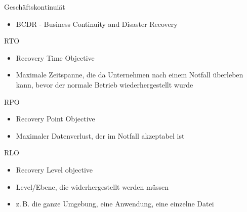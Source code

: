

\begin{flashcard}[Definition]{Geschäftskontinuiät}
  \begin{itemize}
    \item BCDR - Business Continuity and Disaster Recovery
  \end{itemize}
\end{flashcard}

\begin{flashcard}[Definition]{RTO}
  \begin{itemize}
    \item Recovery Time Objective
    \item Maximale Zeitspanne, die da Unternehmen nach einem Notfall überleben kann, bevor der normale Betrieb wiederhergestellt wurde
  \end{itemize}
\end{flashcard}

\begin{flashcard}[Definition]{RPO}
  \begin{itemize}
    \item Recovery Point Objective
    \item Maximaler Datenverlust, der im Notfall akzeptabel ist
  \end{itemize}
\end{flashcard}

\begin{flashcard}[Definition]{RLO}
  \begin{itemize}
    \item Recovery Level objective
    \item Level/Ebene, die widerhergestellt werden müssen
    \item z.\,B. die ganze Umgebung, eine Anwendung, eine einzelne Datei
  \end{itemize}
\end{flashcard}

